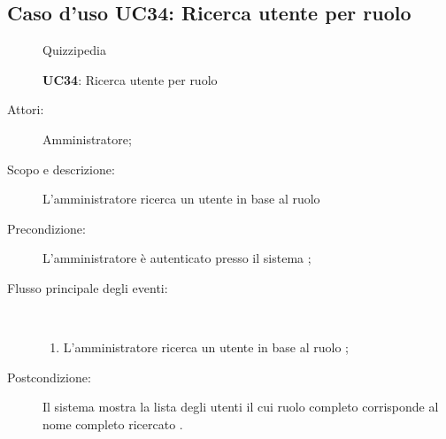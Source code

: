 \subsection{Caso d'uso UC34: Ricerca utente per ruolo}
	\begin{figure}[H]
		\centering
		\begin{resizedtikzpicture}{\textwidth}
		\begin{umlsystem}[x=0, fill=lightgray!20]{Quizzipedia}
		\end{umlsystem}
		\end{resizedtikzpicture}
		\caption{\textbf{UC34}: Ricerca utente per ruolo}
		\label{UC34}
	\end{figure}
\begin{description}
\item[Attori:] Amministratore;
\item[Scopo e descrizione:] L'amministratore ricerca un utente in base al ruolo 

      \item[Precondizione:] L'amministratore è autenticato presso il sistema
;

        \item[Flusso principale degli eventi:] \ 
 \begin{enumerate}
          \item L'amministratore ricerca un utente in base al ruolo 
;

      \end{enumerate}
    \item[Postcondizione:] Il sistema mostra la lista degli utenti il cui ruolo completo corrisponde al nome completo ricercato
.
  \end{description}
\hypertarget{UC35}{}
